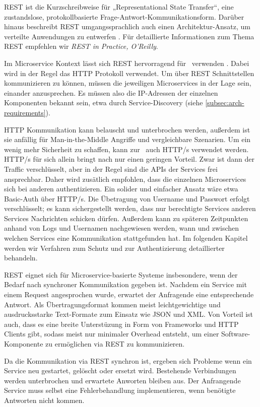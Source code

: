 REST ist die Kurzschreibweise für „Representational State Transfer“, eine zustandslose, protokollbasierte Frage-Antwort-Kommunikationsform. Darüber hinaus beschreibt REST umgangssprachlich auch einen Architektur-Ansatz, um verteilte Anwendungen zu entwerfen \cite{webber2010}. Für detaillierte Informationen zum Thema REST empfehlen wir \textit{REST in Practice, O'Reilly}.

Im Microservice Kontext lässt sich REST hervorragend für \stscom\ verwenden \cite{Fowler+14}. Dabei wird in der Regel das HTTP Protokoll verwendet. Um über REST Schnittstellen kommunizieren zu können, müssen die jeweiligen Microservices in der Lage sein, einander anzusprechen. Es müssen also die IP-Adressen der einzelnen Komponenten bekannt sein, etwa durch Service-Discovery (siehe \ref{subsec:arch-requirements}). 

HTTP Kommunikation kann belauscht und unterbrochen werden, außerdem ist sie anfällig für Man-in-the-Middle Angriffe und vergleichbare Szenarien. Um ein wenig mehr Sicherheit zu schaffen, kann zur \stscom\ auch HTTP/s verwendet werden. HTTP/s für sich allein bringt nach \cite{newman2015} nur einen geringen Vorteil. Zwar ist dann der Traffic verschlüsselt, aber in der Regel sind die APIs der Services frei ansprechbar. Daher wird zusätlich empfohlen, dass die einzelnen Microservices sich bei anderen authentizieren. Ein solider und einfacher Ansatz wäre etwa Basic-Auth über HTTP/s. Die Übetragung von Username und Passwort erfolgt verschlüsselt; es kann sichergestellt werden, dass nur berechtigte Services anderen Services Nachrichten schicken dürfen. Außerdem kann zu späteren Zeitpunkten anhand von Logs und Usernamen nachgewiesen werden, wann und zwischen welchen Services eine Kommunikation stattgefunden hat. Im folgenden Kapitel werden wir Verfahren zum Schutz und zur Authentizierung detaillierter behandeln. 

REST eignet sich für Microservice-basierte Systeme insbesondere, wenn der Bedarf nach synchroner Kommunikation gegeben ist. Nachdem ein Service mit einem Request angesprochen wurde, erwartet der Anfragende eine entsprechende Antwort. Als Übertragungsformat kommen meist leichtgewichtige und ausdrucksstarke Text-Formate zum Einsatz wie JSON und XML. Von Vorteil ist auch, dass es eine breite Unterstüzung in Form von Frameworks und HTTP Clients gibt, sodass meist nur minimaler Overhead entsteht, um einer Software-Komponente zu ermöglichen via REST zu kommunizieren.

Da die Kommunikation via REST synchron ist, ergeben sich Probleme wenn ein Service neu gestartet, gelöscht oder ersetzt wird. Bestehende Verbindungen werden unterbrochen und erwartete Anworten bleiben aus. Der Anfrangende Service muss selbst eine Fehlerbehandlung implementieren, wenn benötigte Antworten nicht kommen. 

